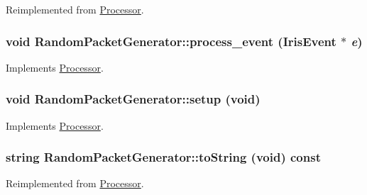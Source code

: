 Reimplemented from \hyperlink{classProcessor_22e869ee49d974ad0ee7ee81961ab88f}{Processor}.\hypertarget{classRandomPacketGenerator_127a1f17b384e0418f055b0c22eb925a}{
\subsubsection[{process\_\-event}]{\setlength{\rightskip}{0pt plus 5cm}void RandomPacketGenerator::process\_\-event ({\bf IrisEvent} $\ast$ {\em e})}}
\label{classRandomPacketGenerator_127a1f17b384e0418f055b0c22eb925a}




Implements \hyperlink{classProcessor_18cdeefafbd8225cb3ad18dd098c0e08}{Processor}.\hypertarget{classRandomPacketGenerator_56eccc2d487bfed691a85afbd0c5b06d}{
\subsubsection[{setup}]{\setlength{\rightskip}{0pt plus 5cm}void RandomPacketGenerator::setup (void)}}
\label{classRandomPacketGenerator_56eccc2d487bfed691a85afbd0c5b06d}




Implements \hyperlink{classProcessor_495fad01358e2d9760c526d6e2db53ea}{Processor}.\hypertarget{classRandomPacketGenerator_4031f11000db9e2693c761f7f47a4c88}{
\subsubsection[{toString}]{\setlength{\rightskip}{0pt plus 5cm}string RandomPacketGenerator::toString (void) const}}
\label{classRandomPacketGenerator_4031f11000db9e2693c761f7f47a4c88}




Reimplemented from \hyperlink{classProcessor_d3bdbedfbb00b05f61504e411a418106}{Processor}.

